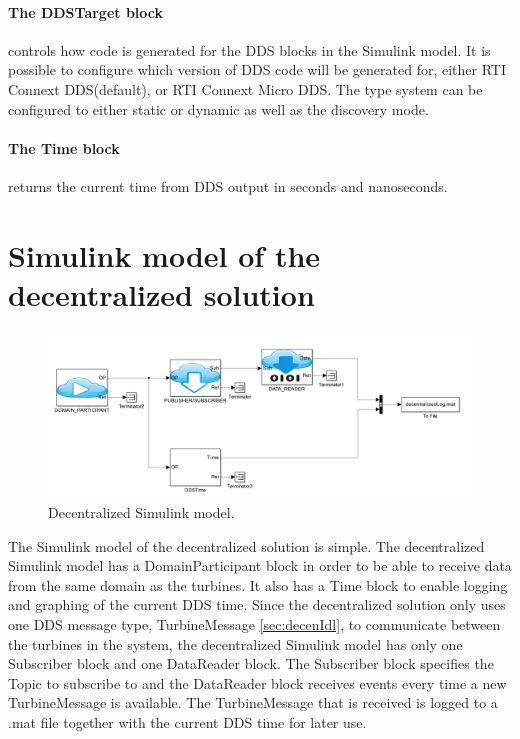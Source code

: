 \paragraph{The DDSTarget block} controls how code is generated for the DDS blocks in the Simulink model. It is possible to configure which version of DDS code will be generated for, either RTI Connext DDS(default), or RTI Connext Micro DDS. The type system can be configured to either static or dynamic as well as the discovery mode.

\paragraph{The Time block} returns the current time from DDS output in seconds and nanoseconds.

\section{Simulink model of the decentralized solution}\label{subsec:decentralizedmodel}

\begin{figure}[!h]
\includegraphics[width=\textwidth]{figures/DecentralizedModel}
	\caption[Decentralized Simulink model]{
		\label{fig:decentralizedSimulinkModel} 
		\footnotesize{%
			Decentralized Simulink model.
		}
	}
\end{figure}

The Simulink model of the decentralized solution is simple. The decentralized Simulink model has a DomainParticipant block in order to be able to receive data from the same domain as the turbines. It also has a Time block to enable logging and graphing of the current DDS time. Since the decentralized solution only uses one DDS message type, TurbineMessage \cref{sec:decenIdl}, to communicate between the turbines in the system, the decentralized Simulink model has only one Subscriber block and one DataReader block. The Subscriber block specifies the Topic to subscribe to and the DataReader block receives events every time a new TurbineMessage is available. The TurbineMessage that is received is logged to a .mat file together with the current DDS time for later use.

